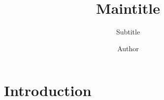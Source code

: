 \documentclass{thesis}
\title{Maintitle}
\subtitle{Subtitle}
\author{Author}
\institute{Institute}
\begin{document}

\cleardoublepage

\startTextChapters

\section{Introduction}

\lipsum
\end{document}
